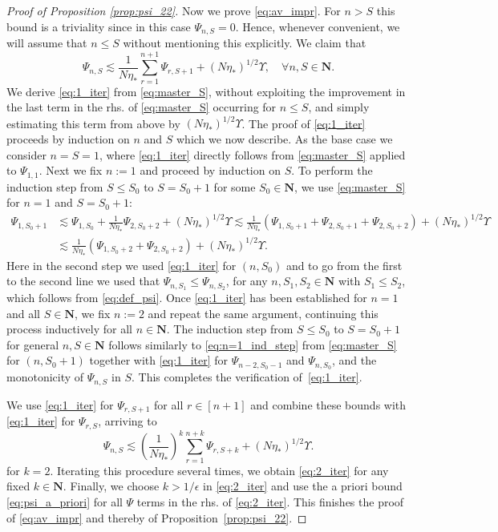 \documentclass[10pt]{amsart}
\numberwithin{equation}{section}
\newcommand{\N}{\mathbf{N}}
\begin{document}
\begin{proof}[Proof of Proposition \ref{prop:psi_22}]
Now we prove \eqref{eq:av_impr}. For $n>S$ this bound is a triviality since in this case $\Psi_{n,S}=0$. Hence, whenever convenient, we will assume that $n\le S$ without mentioning this explicitly. We claim that
\begin{equation}
\Psi_{n,S}\lesssim \frac{1}{N\eta_*}\sum_{r=1}^{n+1}\Psi_{r,S+1}+(N\eta_*)^{1/2}\Upsilon,\quad \forall n,S\in\N.
\label{eq:1_iter}
\end{equation}
We derive \eqref{eq:1_iter} from \eqref{eq:master_S}, without exploiting the improvement in the last term in the rhs. of \eqref{eq:master_S} occurring for $n\le S$, and simply estimating this term from above by $(N\eta_*)^{1/2}\Upsilon$.
The proof of \eqref{eq:1_iter} proceeds by induction on $n$ and $S$ which we now describe. As the base case we consider $n=S=1$, where \eqref{eq:1_iter} directly follows from \eqref{eq:master_S} applied to $\Psi_{1,1}$. Next we fix $n:=1$ and proceed by induction on $S$. To perform the induction step from $S\le S_0$ to $S=S_0+1$ for some $S_0\in\N$, we use \eqref{eq:master_S} for $n=1$ and $S=S_0+1$:
\begin{equation}
\begin{split}
\Psi_{1,S_0+1}&\lesssim \Psi_{1,S_0} + \frac{1}{N\eta_*} \Psi_{2,S_0+2}+(N\eta_*)^{1/2} \Upsilon\lesssim \frac{1}{N\eta_*}\left(\Psi_{1,S_0+1}+\Psi_{2,S_0+1}+\Psi_{2,S_0+2}\right) +(N\eta_*)^{1/2} \Upsilon\\
&\lesssim \frac{1}{N\eta_*}\left(\Psi_{1,S_0+2}+\Psi_{2,S_0+2}\right) +(N\eta_*)^{1/2} \Upsilon.
\end{split}
\label{eq:n=1_ind_step}
\end{equation}
Here in the second step we used \eqref{eq:1_iter} for $(n,S_0)$ and to go from the first to the second line we used that $\Psi_{n,S_1}\le \Psi_{n,S_2}$, for any $n,S_1,S_2\in \N$ with $S_1\le S_2$, which follows from \eqref{eq:def_psi}. Once \eqref{eq:1_iter} has been established for $n=1$ and all $S\in\N$, we fix $n:=2$ and repeat the same argument, continuing this process inductively for all $n\in\N$. The induction step from $S\le S_0$ to $S=S_0+1$ for general $n,S\in\N$ follows similarly to \eqref{eq:n=1_ind_step} from \eqref{eq:master_S} for $(n,S_0+1)$ together with \eqref{eq:1_iter} for $\Psi_{n-2,S_0-1}$ and $\Psi_{n,S_0}$, and the monotonicity of $\Psi_{n,S}$ in $S$. This completes the verification of~\eqref{eq:1_iter}.

We use \eqref{eq:1_iter} for $\Psi_{r,S+1}$ for all $r\in [n+1]$ and combine these bounds with \eqref{eq:1_iter} for $\Psi_{r,S}$, arriving to 
\begin{equation}
\Psi_{n,S}\lesssim \left(\frac{1}{N\eta_*}\right)^k\sum_{r=1}^{n+k}\Psi_{r,S+k}+(N\eta_*)^{1/2}\Upsilon.
\label{eq:2_iter}
\end{equation}
for $k=2$. Iterating this procedure several times, we obtain \eqref{eq:2_iter} for any fixed $k\in\N$. Finally, we choose $k>1/\epsilon$ in \eqref{eq:2_iter} and use the a priori bound \eqref{eq:psi_a_priori}  for all $\Psi$ terms in the rhs. of \eqref{eq:2_iter}. This finishes the proof of \eqref{eq:av_impr} and thereby of Proposition~\ref{prop:psi_22}.
\end{proof}
\end{document}
